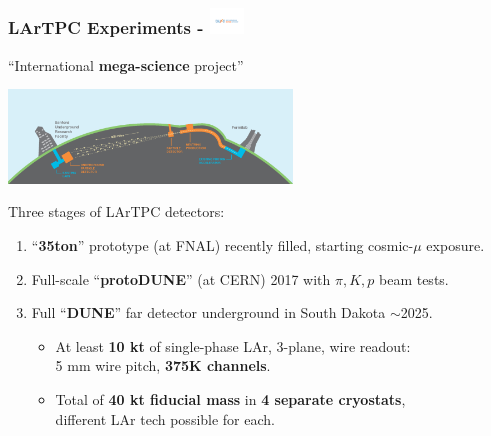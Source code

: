 \documentclass[xcolor=dvipsnames]{beamer}
\begin{document}
\begin{frame}[fragile]
  \frametitle{LArTPC Experiments - \includegraphics[height=7mm,trim=4cm 9.2cm 4cm 9.3cm,clip,valign=c]{DUNElogo_colorHORIZONTAL.pdf}}
  \begin{center}
    ``International \textbf{mega-science} project''

    \includegraphics[height=25mm]{LBNF_Graphic_021715-1024x340.png}
  \end{center}


  Three stages of LArTPC detectors:
  \begin{enumerate}\footnotesize
  \item ``\textbf{35ton}'' prototype (at FNAL) recently filled, starting cosmic-$\mu$ exposure. 
  \item Full-scale ``\textbf{protoDUNE}'' (at CERN) 2017 with $\pi, K, p$ beam tests.
  \item Full ``\textbf{DUNE}'' far detector underground in South Dakota $\sim$2025.
    \begin{itemize}
    \item At least \textbf{10 kt} of single-phase LAr, 3-plane, wire readout: \\
      5 mm wire pitch, \textbf{375K channels}.

    \item Total of \textbf{40 kt fiducial mass} in \textbf{4 separate cryostats}, \\
      \footnotesize{different LAr tech possible for each.}

    \end{itemize}
  \end{enumerate}

  \footnotesize 

\end{frame}
\end{document}
